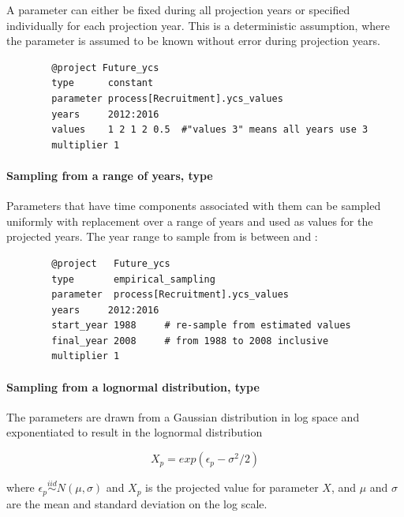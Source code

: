 A parameter can either be fixed during all projection years or specified individually for each projection year. This is a deterministic assumption, where the parameter is assumed to be known without error during projection years.

{\small{\begin{verbatim}
		@project Future_ycs
		type      constant
		parameter process[Recruitment].ycs_values
		years     2012:2016
		values    1 2 1 2 0.5  #"values 3" means all years use 3
		multiplier 1
		\end{verbatim}}}

\paragraph[Empirical sampling]{Sampling from a range of years, type  }\label{sec:Project-EmpiricalSampling}

Parameters that have time components associated with them can be sampled uniformly with replacement over a range of years and used as values for the projected years. The year range to sample from is between  and :

{\small{\begin{verbatim}
		@project   Future_ycs
		type       empirical_sampling
		parameter  process[Recruitment].ycs_values
		years     2012:2016
		start_year 1988     # re-sample from estimated values
		final_year 2008     # from 1988 to 2008 inclusive
		multiplier 1
		\end{verbatim}}}


\paragraph[Lognormal]{Sampling from a lognormal distribution, type  }\label{sec:Project-LogNormal} 

The parameters are drawn from a Gaussian distribution in log space and exponentiated  to result in the lognormal distribution

\begin{equation}\label{eq:lognormal}
X_p = exp(\epsilon_p - \sigma^2 / 2)
\end{equation}

where $\epsilon_p\stackrel{iid}{\sim}N(\mu,\sigma)$ and $X_p$ is the projected value for parameter $X$, and $\mu$ and $\sigma$ are the mean and standard deviation on the log scale.

